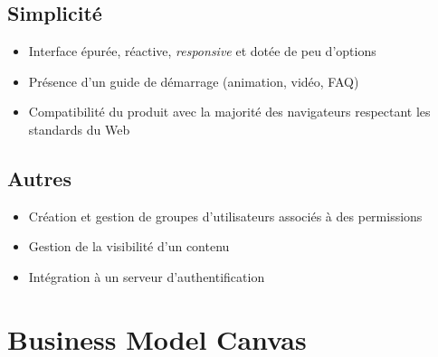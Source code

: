 \documentclass[10pt,twocolumn,a4paper,utf8x]{article}
\begin{document}
\subsection{Simplicité}

\begin{itemize}
\itemsep1pt\parskip0pt
\item
  Interface épurée, réactive, \emph{responsive} et dotée de peu
  d'options
\item
  Présence d'un guide de démarrage (animation, vidéo, FAQ)
\item
  Compatibilité du produit avec la majorité des navigateurs respectant
  les standards du Web
\end{itemize}

\subsection{Autres}

\begin{itemize}
\itemsep1pt\parskip0pt
\item
  Création et gestion de groupes d'utilisateurs associés à des
  permissions
\item
  Gestion de la visibilité d'un contenu
\item
  Intégration à un serveur d'authentification
\end{itemize}

\section{Business Model Canvas}
\end{document}
